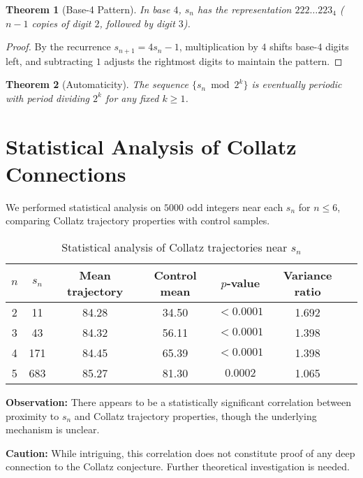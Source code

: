 \documentclass[11pt]{article}
\newtheorem{theorem}{Theorem}[section]
\theoremstyle{definition}
\begin{document}
\begin{theorem}[Base-4 Pattern]\label{thm:base4}
In base $4$, $s_n$ has the representation $222\ldots223_4$ ($n-1$ copies of digit $2$, followed by digit $3$).
\end{theorem}

\begin{proof}
By the recurrence $s_{n+1} = 4s_n - 1$, multiplication by $4$ shifts base-$4$ digits left, and subtracting $1$ adjusts the rightmost digits to maintain the pattern.
\end{proof}

\begin{theorem}[Automaticity]\label{thm:automatic}
The sequence $\{s_n \bmod 2^k\}$ is eventually periodic with period dividing $2^k$ for any fixed $k \geq 1$.
\end{theorem}

\section{Statistical Analysis of Collatz Connections}

We performed statistical analysis on $5000$ odd integers near each $s_n$ for $n \leq 6$, comparing Collatz trajectory properties with control samples.

\begin{table}[h]
\centering
\begin{tabular}{@{}ccccccc@{}}
\toprule
$n$ & $s_n$ & Mean trajectory & Control mean & $p$-value & Variance ratio \\
\midrule
2 & 11 & 84.28 & 34.50 & $<0.0001$ & 1.692 \\
3 & 43 & 84.32 & 56.11 & $<0.0001$ & 1.398 \\
4 & 171 & 84.45 & 65.39 & $<0.0001$ & 1.398 \\
5 & 683 & 85.27 & 81.30 & $0.0002$ & 1.065 \\
\bottomrule
\end{tabular}
\caption{Statistical analysis of Collatz trajectories near $s_n$}
\label{tab:collatz-stats}
\end{table}

\textbf{Observation:} There appears to be a statistically significant correlation between proximity to $s_n$ and Collatz trajectory properties, though the underlying mechanism is unclear.

\textbf{Caution:} While intriguing, this correlation does not constitute proof of any deep connection to the Collatz conjecture. Further theoretical investigation is needed.
\end{document}
